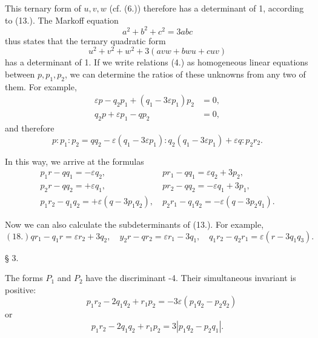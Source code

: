 \documentclass[12pt]{article}
\begin{document}
This ternary form of $u, v, w$ (cf. (6.)) therefore has a determinant of 1, according to (13.). The Markoff equation
$$
a^{2}+b^{2}+c^{2}=3 a b c
$$
thus states that the ternary quadratic form
\begin{equation*}
u^{2}+v^{2}+w^{2}+3(a v w+b w u+c u v) \tag{16.}
\end{equation*}
has a determinant of 1.
If we write relations (4.) as homogeneous linear equations between $p, p_{1}, p_{2}$, we can determine the ratios of these unknowns from any two of them. For example,
\begin{align*}
\varepsilon p-q_{2} p_{1}+\left(q_{1}-3 \varepsilon p_{1}\right) p_{2} &= 0, \\
q_{2}p + \varepsilon p_{1} - q p_{2} &= 0,
\end{align*}
and therefore
\begin{equation*}
p: p_{1}: p_{2}=q q_{2}-\varepsilon\left(q_{1}-3 \varepsilon p_{1}\right): q_{2}\left(q_{1}-3 \varepsilon p_{1}\right)+\varepsilon q: p_{2} r_{2} .
\end{equation*}

In this way, we arrive at the formulas
\begin{align*}
p_{1} r-q q_{1}=-\varepsilon q_{2},\ & p r_{1}-q q_{1}=\varepsilon q_{2}+3 p_{2}, \\
p_{2} r-q q_{2}=+\varepsilon q_{1},\ & p r_{2}-q q_{2}=-\varepsilon q_{1}+3 p_{1},  \tag{17.}\\
p_{1} r_{2}-q_{1} q_{2}=+\varepsilon\left(q-3 p_{1} q_{2}\right),\ & p_{2} r_{1}-q_{1} q_{2}=-\varepsilon\left(q-3 p_{2} q_{1}\right) .
\end{align*}

Now we can also calculate the subdeterminants of (13.). For example,
$$ (18.) q r_{1}-q_{1} r=\varepsilon r_{2}+3 q_{2}, \quad y_{2} r-q r_{2}=\varepsilon r_{1}-3 q_{1}, \quad q_{1} r_{2}-q_{2} r_{1}=\varepsilon\left(r-3 q_{1} q_{3}\right).
$$

\bigskip

\centerline{§ 3.}

\bigskip

The forms $P_{1}$ and $P_{2}$ have the discriminant -4. Their simultaneous invariant is positive:
\begin{equation*}
\quad p_{1} r_{2}-2 q_{1} q_{2}+r_{1} p_{2}=-3 \varepsilon\left(p_{1} q_{2}-p_{2} q_{2}\right)  \tag{1.}
\end{equation*}
or
\begin{equation*}
p_{1} r_{2}-2 q_{1} q_{2}+r_{1} p_{2}=3\left|p_{1} q_{2}-p_{2} q_{1}\right| . \tag{2.}
\end{equation*}
\end{document}
